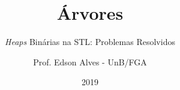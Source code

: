 \title{Árvores}
\subtitle{\textit{Heaps} Binárias na STL: Problemas Resolvidos}
\author{Prof. Edson Alves - UnB/FGA}
\date{2019}
